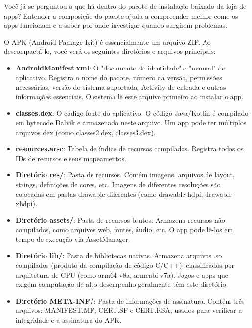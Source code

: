 
Você já se perguntou o que há dentro do pacote de instalação baixado da loja de apps? Entender a composição do pacote ajuda a compreender melhor como os apps funcionam e a saber por onde investigar quando surgirem problemas.


O APK (Android Package Kit) é essencialmente um arquivo ZIP. Ao descompactá-lo, você verá os seguintes diretórios e arquivos principais:

\begin{itemize}
  \item \textbf{AndroidManifest.xml}: O "documento de identidade" e "manual" do aplicativo. Registra o nome do pacote, número da versão, permissões necessárias, versão do sistema suportada, Activity de entrada e outras informações essenciais. O sistema lê este arquivo primeiro ao instalar o app.
  \item \textbf{classes.dex}: O código-fonte do aplicativo. O código Java/Kotlin é compilado em bytecode Dalvik e armazenado neste arquivo. Um app pode ter múltiplos arquivos dex (como classes2.dex, classes3.dex).
  \item \textbf{resources.arsc}: Tabela de índice de recursos compilados. Registra todos os IDs de recursos e seus mapeamentos.
  \item \textbf{Diretório res/}: Pasta de recursos. Contém imagens, arquivos de layout, strings, definições de cores, etc. Imagens de diferentes resoluções são colocadas em pastas drawable diferentes (como drawable-hdpi, drawable-xhdpi).
  \item \textbf{Diretório assets/}: Pasta de recursos brutos. Armazena recursos não compilados, como arquivos web, fontes, áudio, etc. O app pode lê-los em tempo de execução via AssetManager.
  \item \textbf{Diretório lib/}: Pasta de bibliotecas nativas. Armazena arquivos .so compilados (produto da compilação de código C/C++), classificados por arquitetura de CPU (como arm64-v8a, armeabi-v7a). Jogos e apps que exigem computação de alto desempenho geralmente têm este diretório.
  \item \textbf{Diretório META-INF/}: Pasta de informações de assinatura. Contém três arquivos: MANIFEST.MF, CERT.SF e CERT.RSA, usados para verificar a integridade e a assinatura do APK.
\end{itemize}

